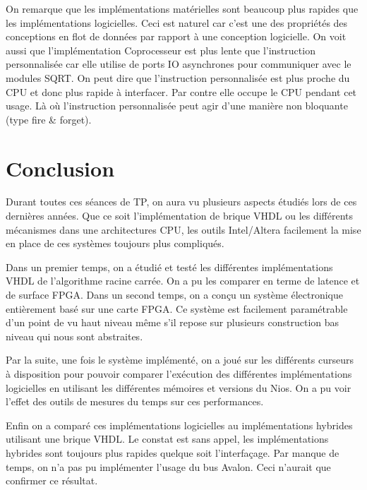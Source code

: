\documentclass[12pt,a4paper]{article}
\begin{document}
On remarque que les implémentations matérielles sont beaucoup plus rapides que les implémentations logicielles. Ceci est naturel car c'est une des propriétés des conceptions en flot de données par rapport à une conception logicielle. On voit aussi que l'implémentation Coprocesseur est plus lente que l'instruction personnalisée car elle utilise de ports IO asynchrones pour communiquer avec le modules SQRT. On peut dire que l'instruction personnalisée est plus proche du CPU et donc plus rapide à interfacer. Par contre elle occupe le CPU pendant cet usage. Là où l'instruction personnalisée peut agir d'une manière non bloquante (type fire \& forget).

\newpage
\section{Conclusion}
Durant toutes ces séances de TP, on aura vu plusieurs aspects étudiés lors de ces dernières années. Que ce soit l'implémentation de brique VHDL ou les différents mécanismes dans une architectures CPU, les outils Intel/Altera facilement la mise en place de ces systèmes toujours plus compliqués.

Dans un premier temps, on a étudié et testé les différentes implémentations VHDL de l'algorithme racine carrée. On a pu les comparer en terme de latence et de surface FPGA. Dans un second temps, on a conçu un système électronique entièrement basé sur une carte FPGA. Ce système est facilement paramétrable d'un point de vu haut niveau même s'il repose sur plusieurs construction bas niveau qui nous sont abstraites. 

Par la suite, une fois le système implémenté, on a joué sur les différents curseurs à disposition pour pouvoir comparer l'exécution des différentes implémentations logicielles en utilisant les différentes mémoires et versions du Nios. On a pu voir l'effet des outils de mesures du temps sur ces performances.

Enfin on a comparé ces implémentations logicielles au implémentations hybrides utilisant une brique VHDL. Le constat est sans appel, les implémentations hybrides sont toujours plus rapides quelque soit l'interfaçage. Par manque de temps, on n'a pas pu implémenter l'usage du bus Avalon. Ceci n'aurait que confirmer ce résultat.
\end{document}

